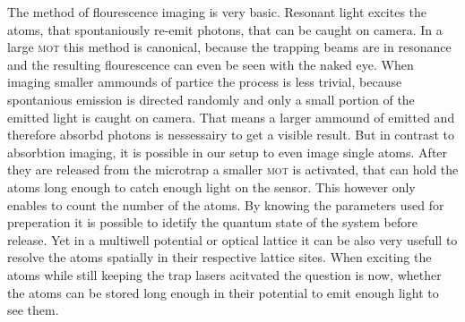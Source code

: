 The method of flourescence imaging is very basic\cite{timo}. Resonant light excites the atoms, that spontaniously re-emit photons, that can be caught on camera. In a large \textsc{mot} this method is canonical, because the trapping beams are in resonance and the resulting flourescence can even be seen with the naked eye. When imaging smaller ammounds of partice the process is less trivial, because spontanious emission is directed randomly and only a small portion of the emitted light is caught on camera. That means a larger ammound of emitted and therefore absorbd photons is nessessairy to get a visible result. But in contrast to absorbtion imaging, it is possible in our setup to even image single atoms. After they are released from the microtrap a smaller \textsc{mot} is activated, that can hold the atoms long enough to catch enough light on the sensor. This however only enables to count the number of the atoms. By knowing the parameters used for preperation it is possible to idetify the quantum state of the system before release. Yet in a multiwell potential or optical lattice it can be also very usefull to resolve the atoms spatially in their respective lattice sites. When exciting the atoms while still keeping the trap lasers acitvated the question is now, whether the atoms can be stored long enough in their potential to emit enough light to see them.

